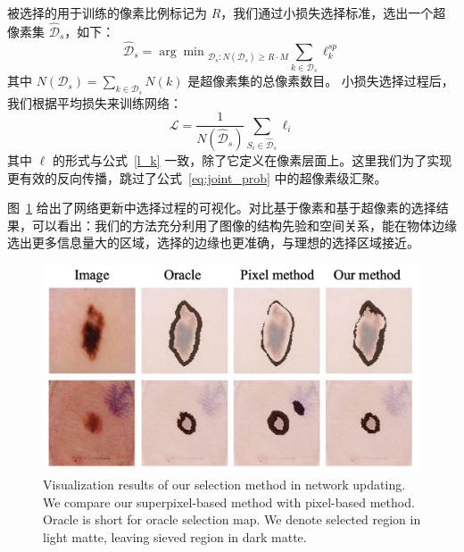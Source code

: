被选择的用于训练的像素比例标记为 $R$，我们通过小损失选择标准，选出一个超像素集 $\mathcal{\hat{D}}_s$，如下：
\begin{equation}
	{\mathcal{\hat{D}}}_s = {\arg\min}_{{\mathcal{D}_s}: N({\mathcal{D}_s})\ge R\cdot M} \sum_{k\in{\mathcal{D}_s}}\ell^{sp}_k 
\end{equation}
其中 $N({\mathcal{D}_s}) = \sum_{k\in {\mathcal{D}_s}} N(k)$ 是超像素集的总像素数目。
小损失选择过程后，我们根据平均损失来训练网络：
\begin{equation}
	\mathcal{L} = \frac{1}{N(\mathcal{\hat{D}}_s)}\sum_{S_i \in \mathcal{\hat{D}}_s}\ell_i
\end{equation}
其中 $\ell$ 的形式与公式~\ref{l_k} 一致，除了它定义在像素层面上。这里我们为了实现更有效的反向传播，跳过了公式~\ref{eq:joint_prob} 中的超像素级汇聚。

图~\ref{fig:vis_select} 给出了网络更新中选择过程的可视化。对比基于像素和基于超像素的选择结果，可以看出：我们的方法充分利用了图像的结构先验和空间关系，能在物体边缘选出更多信息量大的区域，选择的边缘也更准确，与理想的选择区域接近。

    \begin{figure}[tbp]
        \centering 
        \includegraphics[width=1.0\textwidth]{img/c4/b_select2.png}
        {Visualization results of our selection method in network updating. We compare our superpixel-based method with pixel-based method. Oracle is short for oracle selection map. We denote selected region in light matte, leaving sieved region in dark matte. }
        \label{fig:vis_select}
    \end{figure}


